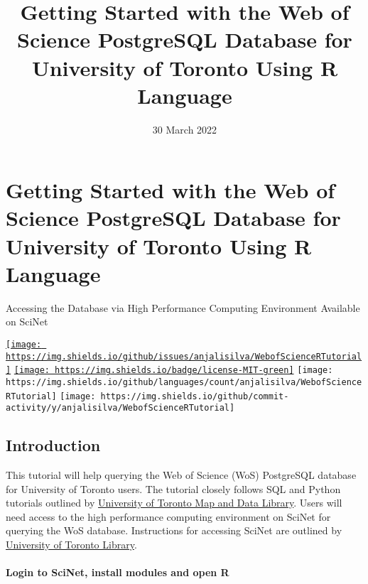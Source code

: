 \documentclass[
]{article}
\title{Getting Started with the Web of Science PostgreSQL Database for
University of Toronto Using R Language}
\author{}
\date{\vspace{-2.5em}30 March 2022}
\begin{document}
\maketitle

\hypertarget{getting-started-with-the-web-of-science-postgresql-database-for-university-of-toronto-using-r-language}{%
\section{Getting Started with the Web of Science PostgreSQL Database for
University of Toronto Using R
Language}\label{getting-started-with-the-web-of-science-postgresql-database-for-university-of-toronto-using-r-language}}

Accessing the Database via High Performance Computing Environment
Available on SciNet

\href{https://github.com/anjalisilva/WebofScienceRTutorial/issues}{\texttt{[image: https://img.shields.io/github/issues/anjalisilva/WebofScienceRTutorial]}}
\href{./LICENSE}{\texttt{[image: https://img.shields.io/badge/license-MIT-green]}}
\texttt{[image: https://img.shields.io/github/languages/count/anjalisilva/WebofScienceRTutorial]}
\texttt{[image: https://img.shields.io/github/commit-activity/y/anjalisilva/WebofScienceRTutorial]}

\hypertarget{introduction}{%
\subsection{Introduction}\label{introduction}}

This tutorial will help querying the Web of Science (WoS) PostgreSQL
database for University of Toronto users. The tutorial closely follows
SQL and Python tutorials outlined by
\href{https://mdl.library.utoronto.ca/technology/tutorials/getting-started-web-science-postgresql-database-MAC}{University
of Toronto Map and Data Library}. Users will need access to the high
performance computing environment on SciNet for querying the WoS
database. Instructions for accessing SciNet are outlined by
\href{https://mdl.library.utoronto.ca/technology/tutorials/how-access-web-science-postgresql-database}{University
of Toronto Library}.

\hypertarget{login-to-scinet-install-modules-and-open-r}{%
\paragraph{Login to SciNet, install modules and open
R}\label{login-to-scinet-install-modules-and-open-r}}
\end{document}
